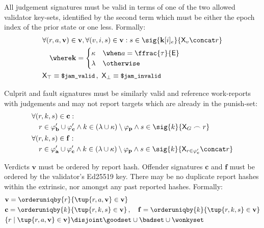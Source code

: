 All judgement signatures must be valid in terms of one of the two allowed validator key-sets, identified by the second term which must be either the epoch index of the prior state or one less. Formally:
\begin{align}
  &\begin{aligned}
    &\forall (r, a, \mathbf{v}) \in \mathbf{v}, \forall (v, i, s) \in \mathbf{v} : s \in \sig{\mathbf{k}[i]_e}{\mathsf{X}_v \concat r}\\
    &\quad\where \mathbf{k} = \begin{cases}
      \kappa &\when a = \displaystyle \ffrac{\tau}{\mathsf{E}}\\
      \lambda &\otherwise\\
    \end{cases}
  \end{aligned}\\
  &\mathsf{X}_\top \equiv \text{{\small \texttt{\$jam\_valid}}}\,,\ \mathsf{X}_\bot \equiv \text{{\small \texttt{\$jam\_invalid}}}
\end{align}

Culprit and fault signatures must be similarly valid and reference work-reports with judgements and may not report targets which are already in the punish-set:
\begin{align}
  &\begin{aligned}
      &\forall (r, k, s) \in \mathbf{c} :\\
      &\quad r \in \varphi'_\mathbf{b} \cup \varphi'_\mathbf{c} \wedge
      k \in (\lambda \cup \kappa) \setminus \varphi_\mathbf{p} \wedge
      s \in \sig{k}{\mathsf{X}_G \frown r}
  \end{aligned}\\
  &\begin{aligned}
      &\forall (r, k, s) \in \mathbf{f} :\\
      &\quad r \in \varphi'_\mathbf{a} \cup \varphi'_\mathbf{c} \wedge
      k \in (\lambda \cup \kappa) \setminus \varphi_\mathbf{p} \wedge
      s \in \sig{k}{\mathsf{X}_{r \in \varphi'_\mathbf{c}} \concat r}\\
  \end{aligned}
\end{align}

Verdicts $\mathbf{v}$ must be ordered by report hash. Offender signatures $\mathbf{c}$ and $\mathbf{f}$ must be ordered by the validator's Ed25519 key. There may be no duplicate report hashes within the extrinsic, nor amongst any past reported hashes. Formally:
\begin{align}
  &\mathbf{v} = \orderuniqby{r}{\tup{r, a, \mathbf{v}} \in \mathbf{v}}\\
  &\mathbf{c} = \orderuniqby{k}{\tup{r, k, s} \in \mathbf{v}} \,,\quad
  \mathbf{f} = \orderuniqby{k}{\tup{r, k, s} \in \mathbf{v}}\\
  &\{r \mid \tup{r, a, \mathbf{v}} \in \mathbf{v}\} \disjoint \goodset \cup \badset \cup \wonkyset
\end{align}

